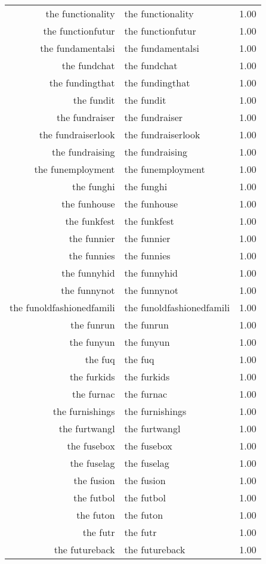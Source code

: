 \begin{table}[ht]
\begin{tabular}{rlr}
  the functionality & the functionality & 1.00 \\ 
  the functionfutur & the functionfutur & 1.00 \\ 
  the fundamentalsi & the fundamentalsi & 1.00 \\ 
  the fundchat & the fundchat & 1.00 \\ 
  the fundingthat & the fundingthat & 1.00 \\ 
  the fundit & the fundit & 1.00 \\ 
  the fundraiser & the fundraiser & 1.00 \\ 
  the fundraiserlook & the fundraiserlook & 1.00 \\ 
  the fundraising & the fundraising & 1.00 \\ 
  the funemployment & the funemployment & 1.00 \\ 
  the funghi & the funghi & 1.00 \\ 
  the funhouse & the funhouse & 1.00 \\ 
  the funkfest & the funkfest & 1.00 \\ 
  the funnier & the funnier & 1.00 \\ 
  the funnies & the funnies & 1.00 \\ 
  the funnyhid & the funnyhid & 1.00 \\ 
  the funnynot & the funnynot & 1.00 \\ 
  the funoldfashionedfamili & the funoldfashionedfamili & 1.00 \\ 
  the funrun & the funrun & 1.00 \\ 
  the funyun & the funyun & 1.00 \\ 
  the fuq & the fuq & 1.00 \\ 
  the furkids & the furkids & 1.00 \\ 
  the furnac & the furnac & 1.00 \\ 
  the furnishings & the furnishings & 1.00 \\ 
  the furtwangl & the furtwangl & 1.00 \\ 
  the fusebox & the fusebox & 1.00 \\ 
  the fuselag & the fuselag & 1.00 \\ 
  the fusion & the fusion & 1.00 \\ 
  the futbol & the futbol & 1.00 \\ 
  the futon & the futon & 1.00 \\ 
  the futr & the futr & 1.00 \\ 
  the futureback & the futureback & 1.00 \\ 

\end{tabular}
\end{table}
